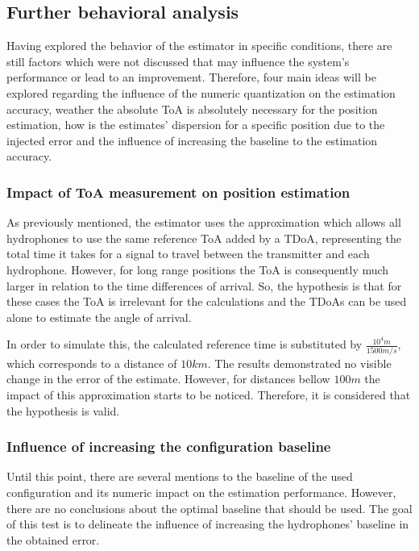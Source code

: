 

\subsection{Further behavioral analysis}


Having explored the behavior of the estimator in specific conditions, there are still factors which were not discussed that may influence the system's performance or lead to an improvement. Therefore, four main ideas will be explored regarding the influence of the numeric quantization on the estimation accuracy, weather the absolute ToA is absolutely necessary for the position estimation, how is the estimates' dispersion for a specific position due to the injected error and the influence of increasing the baseline to the estimation accuracy.

\subsubsection{Impact of ToA measurement on position estimation}

As previously mentioned, the estimator uses the approximation which allows all hydrophones to use the same reference ToA added by a TDoA, representing the total time it takes for a signal to travel between the transmitter and each hydrophone. However, for long range positions the ToA is consequently much larger in relation to the time differences of arrival. So, the hypothesis is that for these cases the ToA is irrelevant for the calculations and the TDoAs can be used alone to estimate the angle of arrival.

In order to simulate this, the calculated reference time is substituted by $\frac{10^4 m}{1500 m/s}$, which corresponds to a distance of $10 km$. The results demonstrated no visible change in the error of the estimate. However, for distances bellow $100m$ the impact of this approximation starts to be noticed. Therefore, it is considered that the hypothesis is valid. 

\subsubsection{Influence of increasing the configuration baseline}


Until this point, there are several mentions to the baseline of the used configuration and its numeric impact on the estimation performance. However, there are no conclusions about the optimal baseline that should be used. The goal of this test is to delineate the influence of increasing the hydrophones' baseline in the obtained error. 

